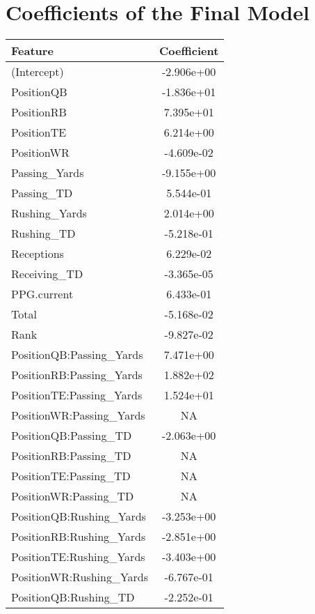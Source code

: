 \clearpage
{\footnotesize \singlespacing
\section{Coefficients of the Final Model}
\label{tab:coeffs}
\begin{tabular}{lc}
	\toprule
	Feature & Coefficient \\
	\midrule
(Intercept)              	& -2.906e+00 \\
PositionQB               	& -1.836e+01 \\
PositionRB               	&  7.395e+01 \\
PositionTE               	&  6.214e+00 \\
PositionWR               	& -4.609e-02 \\
Passing\_Yards            	& -9.155e+00 \\
Passing\_TD               	&  5.544e-01 \\
Rushing\_Yards            	&  2.014e+00 \\
Rushing\_TD               	& -5.218e-01 \\
Receptions               	&  6.229e-02 \\
Receiving\_TD             	& -3.365e-05 \\
PPG.current              	&  6.433e-01 \\
Total                    	& -5.168e-02 \\
Rank                     	& -9.827e-02 \\
PositionQB:Passing\_Yards 	&  7.471e+00 \\
PositionRB:Passing\_Yards 	&  1.882e+02 \\
PositionTE:Passing\_Yards 	&  1.524e+01 \\
PositionWR:Passing\_Yards 	&         NA \\
PositionQB:Passing\_TD    	& -2.063e+00 \\
PositionRB:Passing\_TD    	&         NA \\
PositionTE:Passing\_TD    	&         NA \\
PositionWR:Passing\_TD    	&         NA \\
PositionQB:Rushing\_Yards 	& -3.253e+00 \\
PositionRB:Rushing\_Yards 	& -2.851e+00 \\
PositionTE:Rushing\_Yards 	& -3.403e+00 \\
PositionWR:Rushing\_Yards 	& -6.767e-01 \\
PositionQB:Rushing\_TD    	& -2.252e-01 \\

\end{tabular}}

